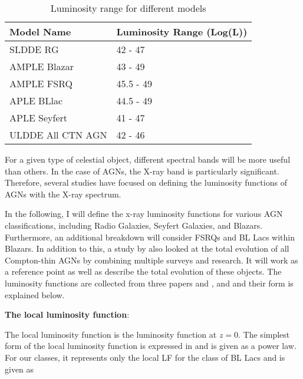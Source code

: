 \begin{table}
    \centering
    \begin{tabular}{ll}
        \hline
        Model Name   & Luminosity Range (Log(L))  \\
        \hline
        SLDDE RG     & 42 - 47            \\
        AMPLE Blazar & 43 - 49          \\
        AMPLE FSRQ   & 45.5 - 49          \\
        APLE BLlac   & 44.5 - 49        \\
        APLE Seyfert & 41 - 47          \\
        ULDDE All CTN AGN & 42 - 46 \\
        \hline

    \end{tabular}
    \caption{Luminosity range for different models}

    \label{tab:lum_range}

\end{table}



For a given type of celestial object, different spectral bands will be more useful than others. In the case of AGNs, 
the X-ray band is particularly significant. Therefore, several studies have focused on defining the luminosity functions of AGNs with the X-ray spectrum.

In the following, I will define the x-ray luminosity functions for various AGN classifications, including Radio Galaxies, Seyfert Galaxies, and Blazars. Furthermore, an additional breakdown will consider FSRQs and BL Lacs within Blazars.  In addition to this, 
a study by \cite{Ueda_2014} also looked at the total evolution of all Compton-thin AGNs by combining multiple surveys and research.  It will work as a reference point as well as describe the total evolution of these objects. The luminosity functions are collected from three papers \cite{Ajello_2009} and \cite{Silverman_2008}, and \cite{Ueda_2014} and their form is explained below.

\textbf{The local luminosity function}:

The local luminosity function is the luminosity function at $z=0$.
The simplest form of the local luminosity function is expressed in \cite{Ajello_2009} and is given as a power law. For our classes, it represents only the local LF for the class of BL Lacs 
and is given as

